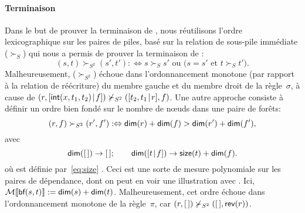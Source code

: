 \paragraph{Terminaison}
\hspace*{-1pt}
  Dans le but de prouver
la terminaison de , nous réutilisons
l'ordre lexicographique sur les paires de piles, basé sur la relation
de sous-pile immédiate (\(\succ_{S}\)) qui nous a permis de prouver la terminaison de
 :
\begin{equation*}
(s,t) \succ_{S^2} (s',t') :\Leftrightarrow \text{\(s \succ_{S} s'\) ou
    (\(s = s'\) et \(t \succ_{S} t'\))}.
\end{equation*}
Malheureusement, (\(\succ_{S^2}\)) échoue dans l'ordonnancement
monotone (par rapport à la relation de réécriture) du membre gauche et
du membre droit de la règle~\(\sigma\), à cause de
\((r,[{\textsf{int}(x,t_1,t_2)}\!\mid\!{f}]) \nsucc_{S^2}
([{t_2,t_1}\!\mid\!{r}],f)\). Une autre approche consiste à définir un
ordre bien fondé sur le nombre de nœuds dans une paire de forêts:
\begin{equation*}
(r,f) \succ_{S^2} (r',f') :\Leftrightarrow \textsf{dim}(r) +
  \textsf{dim}(f) > \textsf{dim}(r') + \textsf{dim}(f'),
\end{equation*}
avec
\begin{equation*}
\textsf{dim}([\,]) \rightarrow [\,];\qquad
\textsf{dim}([{t}\!\mid\!{f}]) \rightarrow \textsf{size}(t) + \textsf{dim}(f).
\end{equation*}
où 
est définie par~\eqref{eq:size} . Ceci est une sorte
de mesure polynomiale sur les
paires de dépendance, dont on
peut en voir une illustration avec
. Ici, \(\mathcal{M}\llbracket{\textsf{bf}(s,t)}\rrbracket :=
\textsf{dim}(s) + \textsf{dim}(t)\). Malheureusement, cet ordre échoue dans
l'ordonnancement monotone de la règle~\(\pi\), car \((r,[\,])
\nsucc_{S^2} ([\,],\textsf{rev}(r))\).

